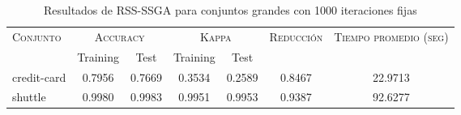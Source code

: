 \begin{table}[]
\centering
\begin{tabular}{l c c c c c c}
\hline
\multirow{2}{*}{\textsc{Conjunto}}
	& \multicolumn{2}{c}{\textsc{Accuracy}}
	& \multicolumn{2}{c}{\textsc{Kappa}}
	& \textsc{Reducción}
	& \textsc{Tiempo promedio (seg)} \\
	& Training & Test
	& Training & Test \\ 
\hline
\hline

credit-card & 0.7956 & 0.7669 & 0.3534 & 0.2589 & 0.8467 & 22.9713 \\
shuttle & 0.9980 & 0.9983 & 0.9951 & 0.9953 & 0.9387 & 92.6277 \\

\hline
\end{tabular}
\caption{Resultados de RSS-SSGA para conjuntos grandes con 1000 iteraciones fijas}
\label{res-grande-RSS-ssga}
\end{table}

